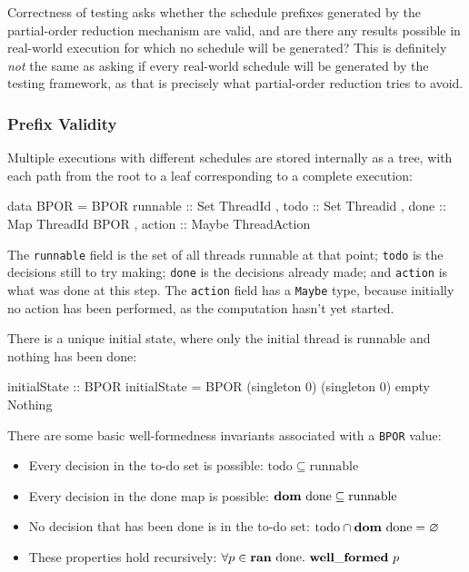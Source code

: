 Correctness of testing asks whether the schedule prefixes generated by
the partial-order reduction mechanism are valid, and are there any
results possible in real-world execution for which no schedule will be
generated? This is definitely \emph{not} the same as asking if every
real-world schedule will be generated by the testing framework, as
that is precisely what partial-order reduction tries to avoid.

\subsubsection{Prefix Validity}
\label{sec:correctness-testing-validity}

Multiple executions with different schedules are stored internally as
a tree, with each path from the root to a leaf corresponding to a
complete execution:

\begin{haskellcode}
data BPOR = BPOR
  { runnable :: Set ThreadId
  , todo     :: Set Threadid
  , done     :: Map ThreadId BPOR
  , action   :: Maybe ThreadAction
  }
\end{haskellcode}

The \verb|runnable| field is the set of all threads runnable at that
point; \verb|todo| is the decisions still to try making; \verb|done|
is the decisions already made; and \verb|action| is what was done at
this step. The \verb|action| field has a \verb|Maybe| type, because
initially no action has been performed, as the computation hasn't yet
started.

There is a unique initial state, where only the initial thread is
runnable and nothing has been done:

\begin{haskellcode}
initialState :: BPOR
initialState = BPOR (singleton 0) (singleton 0) empty Nothing
\end{haskellcode}

There are some basic well-formedness invariants associated with a
\verb|BPOR| value:

\begin{itemize}
\item Every decision in the to-do set is possible:
  $\mathrm{todo} \subseteq \mathrm{runnable}$

\item Every decision in the done map is possible:
  $\mathbf{dom}~\mathrm{done} \subseteq \mathrm{runnable}$

\item No decision that has been done is in the to-do set:
  $\mathrm{todo} \cap \mathbf{dom}~\mathrm{done} = \varnothing$

\item These properties hold recursively:
  $\forall p \in \mathbf{ran}~\mathrm{done}.~\mathbf{well\_formed}~p$
\end{itemize}

